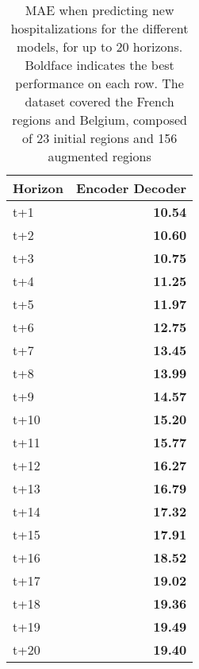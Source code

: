 \begin{table}[H]
\centering
\caption{MAE when predicting new hospitalizations for the different models, for up to 20 horizons. Boldface indicates the best performance on each row. The dataset covered the French regions and Belgium, composed of 23 initial regions and 156 augmented regions }
\label{tab:MAE_comparison}
\begin{tabular}{lr}
\toprule
Horizon &  Encoder Decoder \\
\midrule
t+1  & \textbf{10.54}  \\
t+2  & \textbf{10.60}  \\
t+3  & \textbf{10.75}  \\
t+4  & \textbf{11.25}  \\
t+5  & \textbf{11.97}  \\
t+6  & \textbf{12.75}  \\
t+7  & \textbf{13.45}  \\
t+8  & \textbf{13.99}  \\
t+9  & \textbf{14.57}  \\
t+10  & \textbf{15.20}  \\
t+11  & \textbf{15.77}  \\
t+12  & \textbf{16.27}  \\
t+13  & \textbf{16.79}  \\
t+14  & \textbf{17.32}  \\
t+15  & \textbf{17.91}  \\
t+16  & \textbf{18.52}  \\
t+17  & \textbf{19.02}  \\
t+18  & \textbf{19.36}  \\
t+19  & \textbf{19.49}  \\
t+20  & \textbf{19.40}  \\

\bottomrule
\end{tabular}
\end{table}

